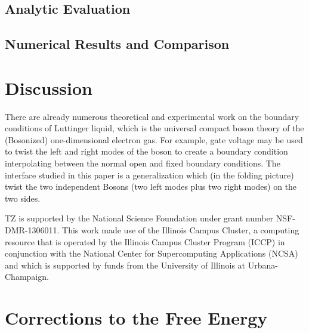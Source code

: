 \documentclass[preprint, prb]{revtex4-1}
\begin{document}
\subsection{Analytic Evaluation}

\subsection{Numerical Results and Comparison}


\section{Discussion}


There are already numerous theoretical and experimental work on the boundary conditions of Luttinger liquid\cite{schmeltzer_zero_1999,anfuso_luttinger_2003,voit_bounded_2000,fabrizio_interacting_1995,egger_applying_1998}, which is the universal compact boson theory of the (Bosonized) one-dimensional electron gas\cite{giamarchi_quantum_2015}. For example, gate voltage \cite{egger_applying_1998} may be used to twist the left and right modes of the boson to create a boundary condition interpolating between the normal open and fixed boundary conditions. The interface studied in this paper is a generalization which (in the folding picture) twist the two independent Bosons (two left modes plus two right modes) on the two sides. 

\begin{acknowledgments}
    TZ is supported by the National Science Foundation under grant number NSF-DMR-1306011.
    This work made use of the Illinois Campus Cluster, a computing resource that is operated by the
    Illinois Campus Cluster Program (ICCP) in conjunction with the National Center for
    Supercomputing Applications (NCSA) and which is supported by funds from the University of
    Illinois at Urbana-Champaign.
\end{acknowledgments}

\appendix
\section{Corrections to the Free Energy}
\label{app:F_correction}

\end{document}
